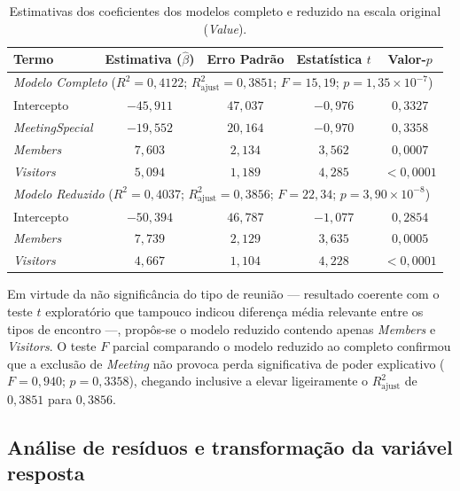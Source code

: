 \documentclass[11pt,a4paper]{article}
\begin{document}
\begin{table}[H]
\centering
\caption{Estimativas dos coeficientes dos modelos completo e reduzido na escala original (\textit{Value}).}
\label{tab:modelos_originais}
\begin{tabular}{lcccc}
\toprule
\textbf{Termo} & \textbf{Estimativa ($\hat{\beta}$)} & \textbf{Erro Padrão} & \textbf{Estatística $t$} & \textbf{Valor-$p$} \\
\midrule
\multicolumn{5}{l}{\textit{Modelo Completo} ($R^2 = 0{,}4122$; $R^2_{\text{ajust}} = 0{,}3851$; $F = 15{,}19$; $p = 1{,}35 \times 10^{-7}$)} \\
Intercepto              & $-45{,}911$ & $47{,}037$ & $-0{,}976$ & $0{,}3327$ \\
\textit{MeetingSpecial} & $-19{,}552$ & $20{,}164$ & $-0{,}970$ & $0{,}3358$ \\
\textit{Members}        & $7{,}603$   & $2{,}134$  & $3{,}562$  & $0{,}0007$ \\
\textit{Visitors}       & $5{,}094$   & $1{,}189$  & $4{,}285$  & $< 0{,}0001$ \\
\midrule
\multicolumn{5}{l}{\textit{Modelo Reduzido} ($R^2 = 0{,}4037$; $R^2_{\text{ajust}} = 0{,}3856$; $F = 22{,}34$; $p = 3{,}90 \times 10^{-8}$)} \\
Intercepto              & $-50{,}394$ & $46{,}787$ & $-1{,}077$ & $0{,}2854$ \\
\textit{Members}        & $7{,}739$   & $2{,}129$  & $3{,}635$  & $0{,}0005$ \\
\textit{Visitors}       & $4{,}667$   & $1{,}104$  & $4{,}228$  & $< 0{,}0001$ \\
\bottomrule
\end{tabular}
\end{table}

Em virtude da não significância do tipo de reunião — resultado coerente com o teste $t$ exploratório que tampouco indicou diferença média relevante entre os tipos de encontro —, propôs-se o modelo reduzido contendo apenas \textit{Members} e \textit{Visitors}. O teste $F$ parcial comparando o modelo reduzido ao completo confirmou que a exclusão de \textit{Meeting} não provoca perda significativa de poder explicativo ($F = 0{,}940$; $p = 0{,}3358$), chegando inclusive a elevar ligeiramente o $R^2_{\text{ajust}}$ de $0{,}3851$ para $0{,}3856$.

\subsection{Análise de resíduos e transformação da variável resposta}
\end{document}
